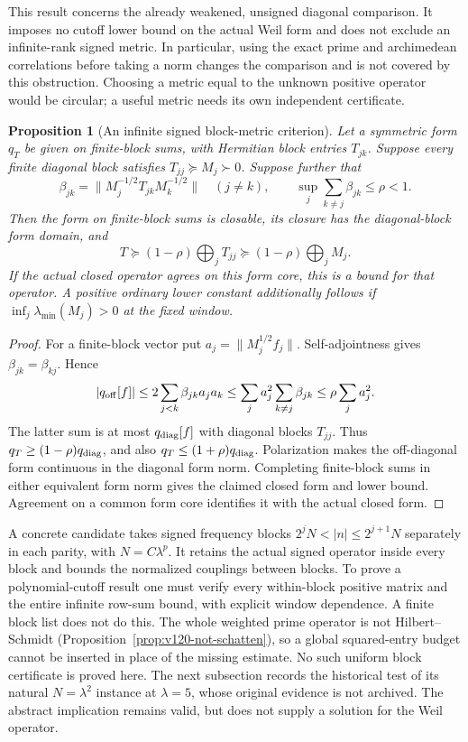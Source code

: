 \documentclass[11pt]{article}
\newtheorem{proposition}[theorem]{Proposition}
\theoremstyle{remark}
\begin{document}
This result concerns the already weakened, unsigned diagonal
comparison. It imposes no cutoff lower bound on the actual Weil form
and does not exclude an infinite-rank signed metric. In particular,
using the exact prime and archimedean correlations before taking a
norm changes the comparison and is not covered by this obstruction.
Choosing a metric equal to the unknown positive operator would be
circular; a useful metric needs its own independent certificate.

\begin{proposition}[An infinite signed block-metric criterion]
\label{prop:v127-block-metric}
Let a symmetric form $q_T$ be given on finite-block sums,
with Hermitian block entries $T_{jk}$. Suppose every finite diagonal
block satisfies $T_{jj}\succeq M_j\succ0$. Suppose further that
\[
 \beta_{jk}=\|M_j^{-1/2}T_{jk}M_k^{-1/2}\|\quad(j\ne k),\qquad
 \sup_j\sum_{k\ne j}\beta_{jk}\le\rho<1.
\]
Then the form on finite-block sums is closable, its closure has the
diagonal-block form domain, and
\[
 T\succeq(1-\rho)\bigoplus_jT_{jj}
   \succeq(1-\rho)\bigoplus_jM_j.
\]
If the actual closed operator agrees on this form core, this is a
bound for that operator. A positive ordinary lower constant additionally
follows if $\inf_j\lambda_{\min}(M_j)>0$ at the fixed window.
\end{proposition}
\begin{proof}
For a finite-block vector put $a_j=\|M_j^{1/2}f_j\|$.
Self-adjointness gives $\beta_{jk}=\beta_{kj}$. Hence
\[
 |q_{\rm off}[f]|\le2\sum_{j<k}\beta_{jk}a_ja_k
 \le\sum_j a_j^2\sum_{k\ne j}\beta_{jk}
 \le\rho\sum_j a_j^2.
\]
The latter sum is at most $q_{\rm diag}[f]$ with diagonal blocks
$T_{jj}$. Thus $q_T\ge(1-\rho)q_{\rm diag}$, and also
$q_T\le(1+\rho)q_{\rm diag}$. Polarization makes the off-diagonal
form continuous in the diagonal form norm. Completing finite-block
sums in either equivalent form norm gives the claimed closed form
and lower bound. Agreement on a common form core identifies it with
the actual closed form.
\end{proof}

A concrete candidate takes signed frequency blocks
$2^jN<|n|\le2^{j+1}N$ separately in each parity, with
$N=C\lambda^p$. It retains the actual signed operator inside every
block and bounds the normalized couplings between blocks. To prove
a polynomial-cutoff result one must verify every within-block positive
matrix and the entire infinite row-sum bound, with explicit window
dependence. A finite block list does not do this. The whole weighted
prime operator is not Hilbert--Schmidt
(Proposition~\ref{prop:v120-not-schatten}), so a global squared-entry
budget cannot be inserted in place of the missing estimate.
No such uniform block certificate is proved here. The next subsection
records the historical test of its natural $N=\lambda^2$ instance at
$\lambda=5$, whose original evidence is not archived. The abstract implication remains
valid, but does not supply a solution for the Weil operator.
\end{document}

